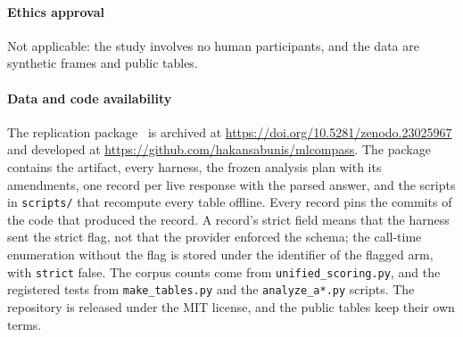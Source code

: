 \documentclass[journal]{IEEEtran}
\begin{document}
\paragraph{Ethics approval}
Not applicable: the study involves no human participants, and the data are
synthetic frames and public tables.



\paragraph{Data and code availability}
The replication package~\cite{replication} is archived at
\url{https://doi.org/10.5281/zenodo.23025967} and developed at
\url{https://github.com/hakansabunis/mlcompass}. The package contains the
artifact, every harness, the frozen analysis plan with its amendments, one record
per live response with the parsed answer, and the scripts in \texttt{scripts/}
that recompute every table offline. Every record pins the commits of the code
that produced the record. A record's strict field means that the harness sent
the strict flag, not that the provider enforced the schema; the call-time
enumeration without the flag is stored under the identifier of the flagged arm,
with \texttt{strict} false. The corpus counts come from
\texttt{unified\_scoring.py}, and the registered tests from
\texttt{make\_tables.py} and the \texttt{analyze\_a*.py} scripts. The repository
is released under the
MIT license, and the public tables keep their own terms.



\end{document}
